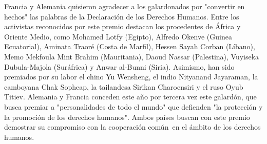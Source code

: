 \documentclass{article}%
\begin{document}
%
Francia y Alemania quisieron agradecer a los galardonados por "convertir en hechos" las palabras de la Declaración de los Derechos Humanos.%
\newline%
%
Entre los activistas reconocidos por este premio destacan los procedentes de África y Oriente Medio, como Mohamed Lotfy (Egipto), Alfredo Okenve (Guinea Ecuatorial), Aminata Traoré (Costa de Marfil), Hessen Sayah Corban (Líbano), Memo Mekfoula Mint Brahim (Mauritania), Daoud Nassar (Palestina), Vuyiseka Dubula{-}Majola (Suráfrica) y Anwar al{-}Bunni (Siria).%
\newline%
%
Asimismo, han sido premiados por su labor el chino Yu Wensheng, el indio Nityanand Jayaraman, la camboyana Chak Sopheap, la tailandesa Sirikan Charoensiri y el ruso Oyub Titiev.%
\newline%
%
Alemania y Francia conceden este año por tercera vez este galardón, que busca premiar a "personalidades de todo el mundo" que defienden "la protección y la promoción de los derechos humanos".%
\newline%
%
Ambos países buscan con este premio demostrar su compromiso con la cooperación común~en el ámbito de los derechos humanos.%
\newline%
%
\end{document}
